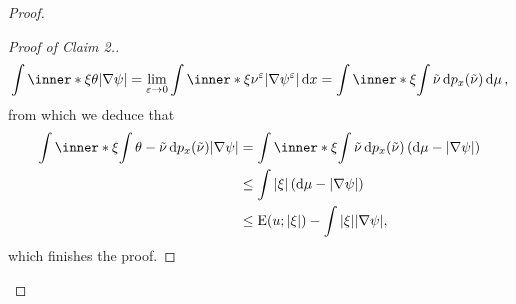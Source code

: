 \begin{proof}
\begin{proof}[Proof of Claim 2.]
\begin{equation*}
			\int
				\inner*{ \xi }{ \theta }
			\abs{ \nabla \psi }
			=
			\lim_{ \varepsilon \to 0 }
				\int
					\inner*{ \xi }{ \nu^{ \varepsilon } }
					\abs{ \nabla \psi^{ \varepsilon } }
				\dd{ x }
			=
			\int
				\inner*{ \xi }{
					\int 
						\tilde{ \nu } 
					\dd{ p_{ x } ( \tilde{ \nu } ) } 
				}
			\dd{ \mu },
		\end{equation*}
		from which we deduce that
		\begin{align*}
			\int
				\inner*{ \xi }{
					\int
						\theta - \tilde{ \nu }
					\dd{ p_{ x } ( \tilde{ \nu } ) }
				}
			\abs{ \nabla \psi }
			& =
			\int
				\inner*{ \xi }{
					\int
						\tilde{ \nu }
					\dd{ p_{ x } ( \tilde{ \nu } ) }
				}
			\left(
				\dd{ \mu } - \abs{ \nabla \psi }
			\right)
			\\
			& \leq
			\int
				\abs{ \xi }
			\left(
				\dd{ \mu } - \abs{ \nabla \psi }
			\right)
			\\
			& \leq
			\energy ( u ; \abs{ \xi } )
			-
			\int
				\abs{ \xi }
			\abs{ \nabla \psi },
		\end{align*}
		which finishes the proof.
	\end{proof}
\end{proof}
 